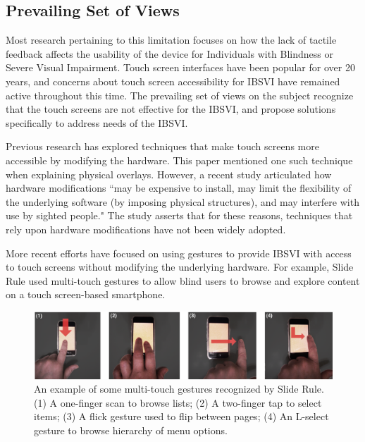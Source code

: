 \documentclass{article}
\begin{document}
\subsection{Prevailing Set of Views}
Most research pertaining to this limitation focuses on how the lack of tactile feedback affects the usability of the device for Individuals with Blindness or Severe Visual Impairment. Touch screen interfaces have been popular for over 20 years, and concerns about touch screen accessibility for IBSVI have remained active throughout this time. \cite{Buxton:1986:HID:22339.22386} The prevailing set of views on the subject recognize that the touch screens are not effective for the IBSVI, and propose solutions specifically to address needs of the IBSVI. 

Previous research has explored techniques that make touch screens more accessible by modifying the hardware. This paper mentioned one such technique when explaining physical overlays.\cite{El-Glaly:2013:TTF:2460625.2460665} However, a recent study articulated how hardware modifications ``may be expensive to install, may limit the flexibility of the underlying software (by imposing physical structures), and may interfere with use by sighted people." \cite{Kane:2011:AOI:2047196.2047232}  The study asserts that for these reasons, techniques that rely upon hardware modifications have not been widely adopted.

More recent efforts have focused on using gestures to provide IBSVI with access to touch screens without modifying the underlying hardware. For example, Slide Rule \cite{Kane:2008:SRM:1414471.1414487} used multi-touch gestures to allow blind users to browse and explore content on a touch screen-based smartphone. 

\begin{figure}[ht]
\centering
\includegraphics[width=4.5in]{slide-rule.jpg} 
\caption{An example of some multi-touch gestures recognized by Slide Rule.(1) A one-finger scan to browse lists; (2) A two-finger tap to select items; (3) A flick gesture used to flip between pages; (4) An L-select gesture to browse hierarchy of menu options. \cite{Kane:2008:SRM:1414471.1414487} }
\label{figure-sample}
\end{figure}
\end{document}
